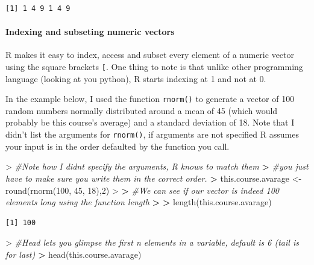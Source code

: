 \documentclass[
]{book}
\newenvironment{Shaded}{\begin{snugshade}}{\end{snugshade}}
\newcommand{\CommentTok}[1]{\textcolor[rgb]{0.56,0.35,0.01}{\textit{#1}}}
\newcommand{\DecValTok}[1]{\textcolor[rgb]{0.00,0.00,0.81}{#1}}
\newcommand{\ErrorTok}[1]{\textcolor[rgb]{0.64,0.00,0.00}{\textbf{#1}}}
\newcommand{\FunctionTok}[1]{\textcolor[rgb]{0.00,0.00,0.00}{#1}}
\newcommand{\NormalTok}[1]{#1}
\newcommand{\OtherTok}[1]{\textcolor[rgb]{0.56,0.35,0.01}{#1}}
\newcommand{\SpecialCharTok}[1]{\textcolor[rgb]{0.00,0.00,0.00}{#1}}
\theoremstyle{definition}
\theoremstyle{definition}
\theoremstyle{definition}
\theoremstyle{definition}
\theoremstyle{remark}
\begin{document}
\begin{verbatim}
[1] 1 4 9 1 4 9
\end{verbatim}

\hypertarget{indexing-and-subseting-numeric-vectors}{%
\paragraph*{\texorpdfstring{\textbf{Indexing and subseting numeric vectors}}{Indexing and subseting numeric vectors}}\label{indexing-and-subseting-numeric-vectors}}

R makes it easy to index, access and subset every element of a numeric vector using the square brackets \texttt{{[}}. One
thing to note is that unlike other programming language (looking at you python), R starts indexing at 1 and not at 0.

In the example below, I used the function \texttt{rnorm()} to generate a vector of 100 random numbers normally distributed around
a mean of 45 (which would probably be this course's average) and a standard deviation of 18.
Note that I didn't list the arguments for \texttt{rnorm()}, if arguments are not specified R assumes your input is in the order
defaulted by the function you call.

\begin{Shaded}
\begin{Highlighting}[]
\SpecialCharTok{\textgreater{}} \CommentTok{\#Note how I didn\textquotesingle{}t specify the arguments, R knows to match them }
\ErrorTok{\textgreater{}} \CommentTok{\#you just have to make sure you write them in the correct order.}
\ErrorTok{\textgreater{}}\NormalTok{ this.course.avarage }\OtherTok{\textless{}{-}} \FunctionTok{round}\NormalTok{(}\FunctionTok{rnorm}\NormalTok{(}\DecValTok{100}\NormalTok{, }\DecValTok{45}\NormalTok{, }\DecValTok{18}\NormalTok{),}\DecValTok{2}\NormalTok{)}
\SpecialCharTok{\textgreater{}} 
\ErrorTok{\textgreater{}} \CommentTok{\#We can see if our vector is indeed 100 elements long using the function length}
\ErrorTok{\textgreater{}} 
\ErrorTok{\textgreater{}} \FunctionTok{length}\NormalTok{(this.course.avarage)}
\end{Highlighting}
\end{Shaded}

\begin{verbatim}
[1] 100
\end{verbatim}

\begin{Shaded}
\begin{Highlighting}[]
\SpecialCharTok{\textgreater{}} \CommentTok{\#Head lets you glimpse the first n elements in a variable, default is 6 (tail is for last)}
\ErrorTok{\textgreater{}} \FunctionTok{head}\NormalTok{(this.course.avarage)}
\end{Highlighting}
\end{Shaded}
\end{document}

